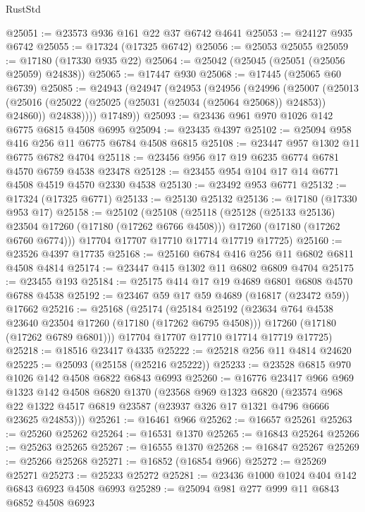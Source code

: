 \begin{lexlean}{RustStd}
\begin{coremodule}
{\begin{coremodule}
{{{{{{{{{{{{{{{{{{{{{{{{{{{{{{{{{{{{{{{{{{{{{{{{{{{{{{{@25051 := @23573 @936 @161 @22 @37 @6742 @4641
@25053 := @24127 @935 @6742
@25055 := @17324 (@17325 @6742)
@25056 := @25053 @25055
@25059 := @17180 (@17330 @935 @22)
@25064 := @25042 (@25045 (@25051 (@25056 @25059) @24838))
@25065 := @17447 @930
@25068 := @17445 (@25065 @60 @6739)
@25085 := @24943
    (@24947
      (@24953
        (@24956
          (@24996
            (@25007
              (@25013
                (@25016 (@25022 (@25025 (@25031 (@25034 (@25064 @25068)) @24853)) @24860))
                @24838))))
        @17489))
@25093 := @23436 @961 @970 @1026 @142 @6775 @6815 @4508 @6995
@25094 := @23435 @4397
@25102 := @25094 @958 @416 @256 @11 @6775 @6784 @4508 @6815
@25108 := @23447 @957 @1302 @11 @6775 @6782 @4704
@25118 := @23456 @956 @17 @19 @6235 @6774 @6781 @4570 @6759 @4538 @23478
@25128 := @23455 @954 @104 @17 @14 @6771 @4508 @4519 @4570 @2330 @4538
@25130 := @23492 @953 @6771
@25132 := @17324 (@17325 @6771)
@25133 := @25130 @25132
@25136 := @17180 (@17330 @953 @17)
@25158 := @25102
    (@25108
      (@25118
        (@25128 (@25133 @25136) @23504 @17260 (@17180 (@17262 @6766 @4508)))
        @17260
        (@17180 (@17262 @6760 @6774)))
      @17704
      @17707
      @17710
      @17714
      @17719
      @17725)
@25160 := @23526 @4397 @17735
@25168 := @25160 @6784 @416 @256 @11 @6802 @6811 @4508 @4814
@25174 := @23447 @415 @1302 @11 @6802 @6809 @4704
@25175 := @23455 @193
@25184 := @25175 @414 @17 @19 @4689 @6801 @6808 @4570 @6788 @4538
@25192 := @23467 @59 @17 @59 @4689 (@16817 (@23472 @59)) @17662
@25216 := @25168
    (@25174
      (@25184
        @25192
        (@23634 @764 @4538 @23640 @23504 @17260 (@17180 (@17262 @6795 @4508)))
        @17260
        (@17180 (@17262 @6789 @6801)))
      @17704
      @17707
      @17710
      @17714
      @17719
      @17725)
@25218 := @18516 @23417 @4335
@25222 := @25218 @256 @11 @4814 @24620
@25225 := @25093 (@25158 (@25216 @25222))
@25233 := @23528 @6815 @970 @1026 @142 @4508 @6822 @6843 @6993
@25260 := @16776
    @23417
    @966
    @969
    @1323
    @142
    @4508
    @6820
    @1370
    (@23568
      @969
      @1323
      @6820
      (@23574 @968 @22 @1322 @4517 @6819 @23587 (@23937 @326 @17 @1321 @4796 @6666 @23625 @24853)))
@25261 := @16461 @966
@25262 := @16657 @25261
@25263 := @25260 @25262
@25264 := @16531 @1370
@25265 := @16843 @25264
@25266 := @25263 @25265
@25267 := @16555 @1370
@25268 := @16847 @25267
@25269 := @25266 @25268
@25271 := @16852 (@16854 @966)
@25272 := @25269 @25271
@25273 := @25233 @25272
@25281 := @23436 @1000 @1024 @404 @142 @6843 @6923 @4508 @6993
@25289 := @25094 @981 @277 @999 @11 @6843 @6852 @4508 @6923
}}}}}}}}}}}}}}}}}}}}}}}}}}}}}}}}}}}}}}}}}}}}}}}}}}}}}}}
\end{coremodule}}
\end{coremodule}
\end{lexlean}
